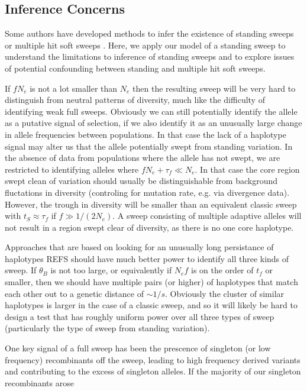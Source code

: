 \documentclass[a4paper,10pt]{article}
\begin{document}
\subsection{Inference Concerns}

Some authors have developed methods to infer the existence of standing sweeps \citep{Peter:2012hta} or multiple hit soft sweeps \citep{Garud:2013ve}. Here, we apply our model of a standing sweep to understand the limitations to inference of standing sweeps and to explore issues of potential confounding between standing and multiple hit soft sweeps.

If $f N_e$ is not a lot smaller than $N_e$ then the resulting sweep will be very hard to distinguish from neutral patterns of diversity, much like the difficulty of identifying weak full sweeps. Obviously we can still potentially identify the allele as a putative signal of selection, if we also identify it as an unusually large change in allele frequencies between populations. In that case the lack of a haplotype signal may alter us that the allele potentially swept from standing variation. In the absence of data from populations where the allele has not swept, we are restricted to identifying alleles where $f N_e + \tau_{f} \ll N_e$. In that case the core region swept clean of variation should usually be distinguishable from background fluctations in diversity (controling for mutation rate, e.g. via divergence data). However, the trough in diversity will be smaller than an equivalent classic sweep with $t_S \approx \tau_{f}$ if $f \gg 1/(2N_e)$. A sweep consisting of multiple adaptive alleles will not result in a region swept clear of diversity, as there is no one core haplotype.

Approaches that are based on looking for an unusually long persistance of haplotypes REFS should have much better power to identify all three kinds of sweep. If $\theta_B$ is not too large, or equivalently if $N_ef$ is on the order of $t_f$ or smaller, then we should have multiple pairs (or higher) of haplotypes that match each other out to a genetic distance of $\sim 1/s$. Obviously the cluster of similar haplotypes is larger in the case of a classic sweep, and so it will likely be hard to design a test that has roughly uniform power over all three types of sweep (particularly the type of sweep from standing variation).

One key signal of a full sweep has been the prescence of singleton (or low frequency) recombinants off the sweep, leading to high frequency derived variants and contributing to the excess of singleton alleles. If the majority of our singleton recombinants arose
\end{document}
